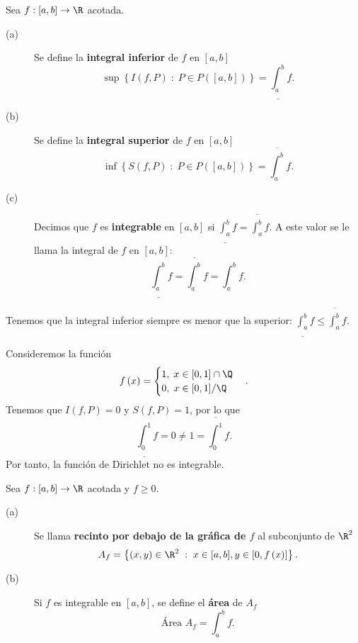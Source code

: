 \begin{fdefinition}[]
	\normalfont Sea $\displaystyle f: [a,b] \to \R  $ acotada.
	\begin{description}
		\item[(a)] Se define la \textbf{integral inferior } de $\displaystyle f $ en $\displaystyle [a,b] $ 
			\[ \sup\left\{ I\left(f,P\right) \; : \; P \in P\left([a,b]\right) \right\} = \underline{\int^{b}_{a}} f   .\]
		\item[(b)] Se define la \textbf{integral superior} de $\displaystyle f $ en $\displaystyle [a,b] $ 
			\[ \inf \left\{ S\left(f,P\right) \; : \; P \in P\left([a,b]\right)\right\} = \overline{\int^{b}_{a}} f .\]
		\item[(c)] Decimos que $\displaystyle f $ es \textbf{integrable} en $\displaystyle [a,b] $ si $\displaystyle \underline{\int^{b}_{a}} f = \overline{\int^{b}_{a}} f $. A este valor se le llama la integral de $\displaystyle f $ en $\displaystyle [a,b] $:
			\[ \underline{\int^{b}_{a}} f = \overline{\int^{b}_{a}} f  = \int^{b}_{a} f  .\]
	\end{description}
\end{fdefinition}
\begin{observation}
	\normalfont Tenemos que la integral inferior siempre es menor que la superior: $\displaystyle \underline{\int^{b}_{a}} f  \leq \overline{\int^{b}_{a}} f $.
\end{observation}
\begin{eg}
\normalfont Consideremos la función 
\[f\left(x\right) = 
\begin{cases}
	1, \; x \in [0,1] \cap \Q \\
	0, \; x \in [0,1] / \Q
\end{cases}
.\]
Tenemos que $\displaystyle I\left(f, P\right) = 0 $ y $\displaystyle S\left(f,P\right) = 1 $, por lo que 
\[ \underline{\int^{1}_{0}}  f = 0 \neq 1 = \overline{\int^{1}_{0}} f .\]
Por tanto, la función de Dirichlet no es integrable.
\end{eg}
\begin{fdefinition}[Área]
	\normalfont Sea $\displaystyle f : [a,b] \to \R$ acotada y $\displaystyle f \geq 0 $. 
	\begin{description}
	\item[(a)] Se llama \textbf{recinto por debajo de la gráfica de $\displaystyle f $} al subconjunto de $\displaystyle \R^{2} $ 
		\[ A_{f} = \left\{ \left(x,y\right) \in \R^{2}\; : \; x \in [a,b], y \in [0,f\left(x\right)]\right\}  .\]
	\item[(b)] Si $\displaystyle f $ es integrable en $\displaystyle [a,b] $, se define el \textbf{área} de $\displaystyle A_{f} $ 
		\[ \text{Área }A_{f} = \int^{b}_{a} f .\]
	\end{description}
\end{fdefinition}
